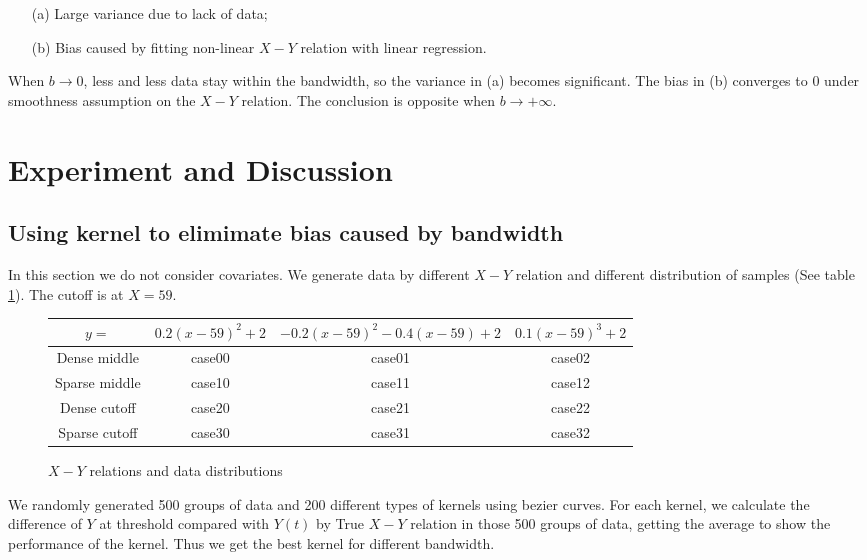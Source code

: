 \documentclass[a4 paper,12pt]{article}
\begin{document}
\begin{enumerate}
   \item[(a)] Large variance due to lack of data;
   \item[(b)] Bias caused by fitting non-linear $X-Y$ relation with linear regression.
\end{enumerate}

When $b\to 0$, less and less data stay within the bandwidth, so the variance in (a) becomes significant. The bias in (b) converges to $0$ under smoothness assumption on the $X-Y$ relation. The conclusion is opposite when $b\to+\infty$.


\section{Experiment and Discussion}

\subsection{Using kernel to elimimate bias caused by bandwidth}

In this section we do not consider covariates. We generate data by different $X-Y$ relation and different distribution of samples (See table \ref{table:kernels_test}). The cutoff is at $X=59$.

\begin{figure}[h]
	\centering
   \begin{tabular}{|c|c|c|c|}
      \hline
      $y=$&$0.2(x-59)^2+2$&$-0.2(x-59)^2-0.4(x-59)+2$&$0.1(x-59)^3+2$\\
      \hline
      Dense middle&case00&case01&case02\\
      \hline
      Sparse middle&case10&case11&case12\\
      \hline
      Dense cutoff&case20&case21&case22\\
      \hline
      Sparse cutoff&case30&case31&case32\\
      \hline
   \end{tabular}
   \caption{$X-Y$ relations and data distributions}
   \label{table:kernels_test}
\end{figure}

We randomly generated 500 groups of data and 200 different types of kernels using bezier curves. For each kernel, we calculate the difference of $Y$ at threshold compared with $Y(t)$ by True $X-Y$ relation in those 500 groups of data, getting the average to show the performance of the kernel. Thus we get the best kernel for different bandwidth.
\end{document}
